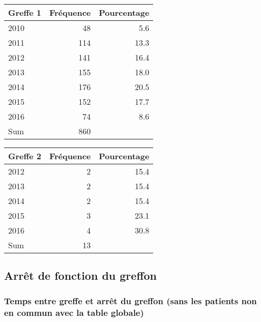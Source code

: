 \documentclass[11pt,a4paper]{article}\usepackage[]{graphicx}\usepackage[]{color}
\begin{document}
\begin{multicols}{2}
\begin{table}[H]
\centering
\begin{tabular}{lrr}
  \hline
Greffe 1 & Fréquence & Pourcentage \\ 
  \hline
2010 & 48 & 5.6 \\ 
  2011 & 114 & 13.3 \\ 
  2012 & 141 & 16.4 \\ 
  2013 & 155 & 18.0 \\ 
  2014 & 176 & 20.5 \\ 
  2015 & 152 & 17.7 \\ 
  2016 & 74 & 8.6 \\ 
  Sum & 860 &  \\ 
   \hline
\end{tabular}
\end{table}
\begin{table}[H]
\centering
\begin{tabular}{lrr}
  \hline
Greffe 2 & Fréquence & Pourcentage \\ 
  \hline
2012 &  2 & 15.4 \\ 
  2013 &  2 & 15.4 \\ 
  2014 &  2 & 15.4 \\ 
  2015 &  3 & 23.1 \\ 
  2016 &  4 & 30.8 \\ 
  Sum & 13 &  \\ 
   \hline
\end{tabular}
\end{table}

\end{multicols}

  \subsection{Arrêt de fonction du greffon}

    \subsubsection{Temps entre greffe et arrêt du greffon (sans les patients non en commun avec la table globale)}
\end{document}
